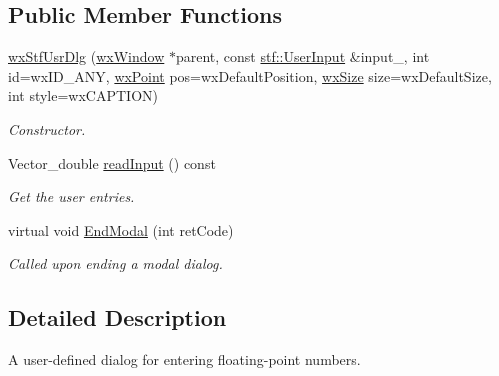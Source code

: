 \subsection*{Public Member Functions}
\begin{DoxyCompactItemize}
\item 
\hyperlink{classwxStfUsrDlg_a5306c9bb0fd621aef6ae8fa7b0303c47}{wxStfUsrDlg} (\hyperlink{classwxWindow}{wxWindow} $\ast$parent, const \hyperlink{structstf_1_1UserInput}{stf::UserInput} \&input\_\-, int id=wxID\_\-ANY, \hyperlink{classwxPoint}{wxPoint} pos=wxDefaultPosition, \hyperlink{classwxSize}{wxSize} size=wxDefaultSize, int style=wxCAPTION)
\begin{DoxyCompactList}\small\item\em Constructor. \item\end{DoxyCompactList}\item 
Vector\_\-double \hyperlink{classwxStfUsrDlg_a1fe12e1eb261f0a6246b951f00a90ea8}{readInput} () const 
\begin{DoxyCompactList}\small\item\em Get the user entries. \item\end{DoxyCompactList}\item 
virtual void \hyperlink{classwxStfUsrDlg_ac0e7b646afd04f34dc0e6e5ddec30f1b}{EndModal} (int retCode)
\begin{DoxyCompactList}\small\item\em Called upon ending a modal dialog. \item\end{DoxyCompactList}\end{DoxyCompactItemize}


\subsection{Detailed Description}
A user-\/defined dialog for entering floating-\/point numbers. 

